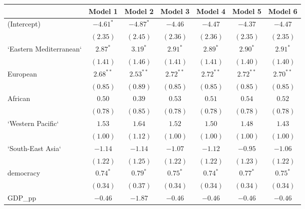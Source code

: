 
\begin{table}[!h]
\begin{center}
\begin{tabular}{l c c c c c c }
\toprule
 & Model 1 & Model 2 & Model 3 & Model 4 & Model 5 & Model 6 \\
\midrule
(Intercept)             & $-4.61^{*}$  & $-4.87^{*}$  & $-4.46$      & $-4.47$      & $-4.37$      & $-4.47$      \\
                        & $(2.35)$     & $(2.45)$     & $(2.36)$     & $(2.36)$     & $(2.35)$     & $(2.35)$     \\
`Eastern Mediterranean` & $2.87^{*}$   & $3.19^{*}$   & $2.91^{*}$   & $2.89^{*}$   & $2.90^{*}$   & $2.91^{*}$   \\
                        & $(1.41)$     & $(1.46)$     & $(1.41)$     & $(1.41)$     & $(1.40)$     & $(1.40)$     \\
European                & $2.68^{**}$  & $2.53^{**}$  & $2.72^{**}$  & $2.72^{**}$  & $2.72^{**}$  & $2.70^{**}$  \\
                        & $(0.85)$     & $(0.89)$     & $(0.85)$     & $(0.85)$     & $(0.85)$     & $(0.85)$     \\
African                 & $0.50$       & $0.39$       & $0.53$       & $0.51$       & $0.54$       & $0.52$       \\
                        & $(0.78)$     & $(0.85)$     & $(0.78)$     & $(0.78)$     & $(0.78)$     & $(0.78)$     \\
`Western Pacific`       & $1.53$       & $1.64$       & $1.52$       & $1.50$       & $1.48$       & $1.43$       \\
                        & $(1.00)$     & $(1.12)$     & $(1.00)$     & $(1.00)$     & $(1.00)$     & $(1.00)$     \\
`South-East Asia`       & $-1.14$      & $-1.14$      & $-1.07$      & $-1.12$      & $-0.95$      & $-1.06$      \\
                        & $(1.22)$     & $(1.25)$     & $(1.22)$     & $(1.22)$     & $(1.23)$     & $(1.22)$     \\
democracy               & $0.74^{*}$   & $0.79^{*}$   & $0.75^{*}$   & $0.74^{*}$   & $0.77^{*}$   & $0.75^{*}$   \\
                        & $(0.34)$     & $(0.37)$     & $(0.34)$     & $(0.34)$     & $(0.34)$     & $(0.34)$     \\
GDP\_pp                 & $-0.46$      & $-1.87$      & $-0.46$      & $-0.46$      & $-0.46$      & $-0.46$      \\

\end{tabular}
\end{center}
\end{table}
